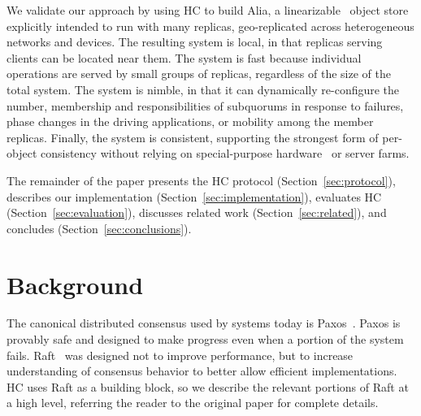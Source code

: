 \documentclass[letterpaper,10pt,twocolumn]{article}
\newcommand{\subs}{subquorums\xspace}
\newcommand{\sys}{Alia\xspace}
\begin{document}
We validate our approach by using HC to build \sys, a
linearizable~\cite{linearizability,attiya_sequential_1994} object
store explicitly intended to run with many replicas,
geo-replicated across heterogeneous networks and devices.
The resulting system is local, in that replicas serving clients can be
located near them.
The system is fast because individual operations are served by small
groups of replicas, regardless of the size of the total system.
The system is nimble, in that it can dynamically re-configure the
number, membership and responsibilities of \subs in response to
failures, phase changes in the driving applications, or mobility among
the member replicas.
Finally, the system is consistent, supporting the strongest form of
per-object consistency without relying on special-purpose
hardware~\cite{fawn,corfu,tango,spanner,vcorfu} or server farms.



The remainder of the paper presents the HC protocol (Section~\ref{sec:protocol}),
describes our implementation (Section~\ref{sec:implementation}), evaluates HC
(Section~\ref{sec:evaluation}), discusses related work (Section~\ref{sec:related}), and
concludes (Section~\ref{sec:conclusions}).

\section{Background}
\label{sec:background}

The canonical distributed consensus used by systems today is
Paxos~\cite{paxos,lamport_paxos_2001}.
Paxos is provably safe and designed to make progress even when a portion of
the system fails.
Raft~\cite{raft} was designed not to improve performance, but to increase
understanding of consensus behavior to better allow efficient implementations.
HC uses Raft as a building block, so we describe the relevant portions of Raft
at a high level, referring the reader to the original paper for complete details.
\end{document}
